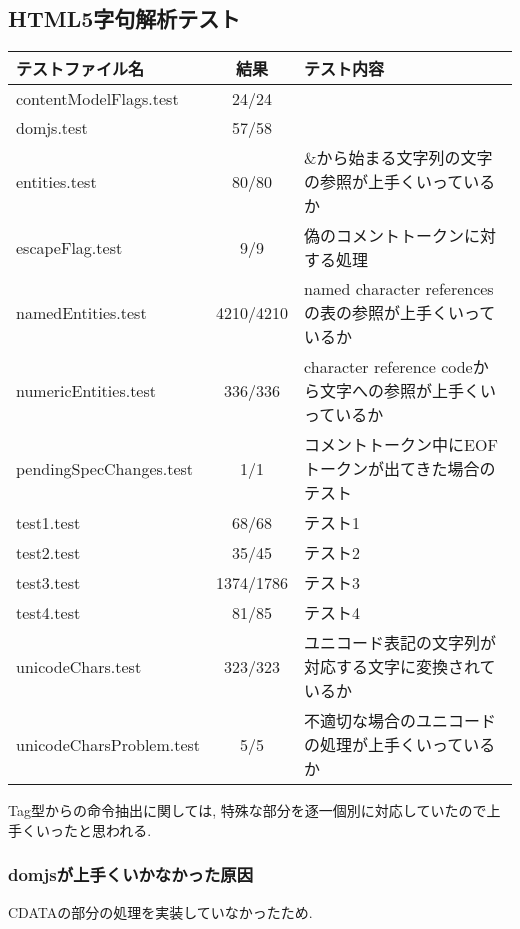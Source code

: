 \documentclass[uplatex,a4j]{jsreport}
\begin{document}
\subsection{HTML5字句解析テスト}
\begin{table}[htb]
    \begin{tabular}{|l|c|l|} \hline
      テストファイル名 & 結果 & テスト内容\\ \hline 
      contentModelFlags.test & 24/24 &  \\
      domjs.test & 57/58 &  \\
      entities.test & 80/80 & \&から始まる文字列の文字の参照が上手くいっているか\\
      escapeFlag.test & 9/9 & 偽のコメントトークンに対する処理\\
      namedEntities.test & 4210/4210 & named character referencesの表の参照が上手くいっているか\\
      numericEntities.test & 336/336 & character reference codeから文字への参照が上手くいっているか\\
      pendingSpecChanges.test & 1/1 & コメントトークン中にEOFトークンが出てきた場合のテスト\\
      test1.test & 68/68 & テスト1 \\
      test2.test & 35/45 & テスト2 \\
      test3.test & 1374/1786 & テスト3 \\
      test4.test & 81/85 & テスト4 \\
      unicodeChars.test & 323/323 & ユニコード表記の文字列が対応する文字に変換されているか\\
      unicodeCharsProblem.test & 5/5 & 不適切な場合のユニコードの処理が上手くいっているか\\ \hline 
    \end{tabular}
\end{table}

Tag型からの命令抽出に関しては, 特殊な部分を逐一個別に対応していたので上手くいったと思われる.%
\subsubsection*{domjsが上手くいかなかった原因}
CDATAの部分の処理を実装していなかったため.
\end{document}
